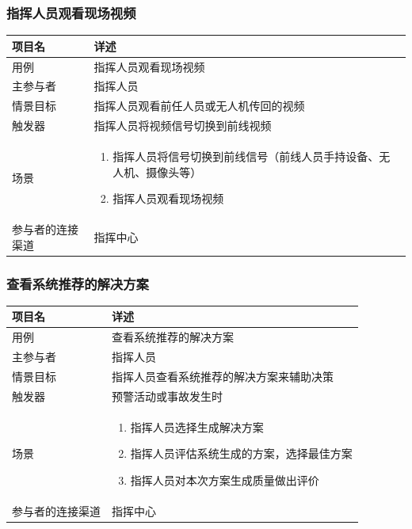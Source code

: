 \documentclass{ctexrep}
\begin{document}
\subsubsection{指挥人员观看现场视频}
\begin{longtable}{p{2cm} | p{10cm}}
\hline
项目名 & 详述 \\
\hline
\hline
用例 & 指挥人员观看现场视频\\
\hline
主参与者 & 指挥人员 \\
\hline
情景目标 &  指挥人员观看前任人员或无人机传回的视频\\
\hline
触发器 &  指挥人员将视频信号切换到前线视频\\
\hline
场景 & \begin{enumerate}
	\item 指挥人员将信号切换到前线信号（前线人员手持设备、无人机、摄像头等）
	\item 指挥人员观看现场视频
\end{enumerate} \\
\hline
参与者的连接渠道 & 指挥中心 \\
\hline
\end{longtable}

\subsubsection{查看系统推荐的解决方案}
\begin{longtable}{p{2cm} | p{10cm}}
\hline
项目名 & 详述 \\
\hline
\hline
用例 & 查看系统推荐的解决方案\\
\hline
主参与者 & 指挥人员 \\
\hline
情景目标 &  指挥人员查看系统推荐的解决方案来辅助决策\\
\hline
触发器 &  预警活动或事故发生时\\
\hline
场景 & \begin{enumerate}
	\item 指挥人员选择生成解决方案
	\item 指挥人员评估系统生成的方案，选择最佳方案
	\item 指挥人员对本次方案生成质量做出评价
\end{enumerate} \\
\hline
参与者的连接渠道 & 指挥中心 \\
\hline
\end{longtable}
\end{document}
